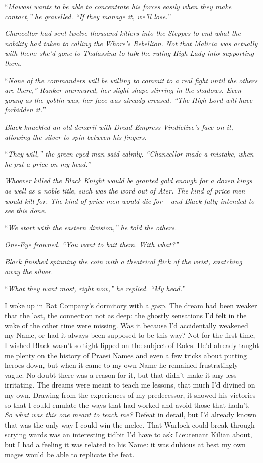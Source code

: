 \documentclass[12pt, openany]{book}
\begin{document}
“\textit{Mawasi wants to be able to concentrate his forces easily when they make contact,” he gravelled. “If they manage it, we’ll lose.”}

\textit{Chancellor had sent twelve thousand killers into the Steppes to end what the nobility had taken to calling the Whore’s Rebellion. Not that Malicia was actually with them: she’d gone to Thalassina to talk the ruling High Lady into supporting them. }

“\textit{None of the commanders will be willing to commit to a real fight until the others are there,” Ranker murmured, her slight shape stirring in the shadows. Even young as the goblin was, her face was already creased. “The High Lord will have forbidden it.”}

\textit{Black knuckled an old denarii with Dread Empress Vindictive’s face on it, allowing the silver to spin between his fingers.}

“\textit{They will,” the green-eyed man said calmly. “Chancellor made a mistake, when he put a price on my head.”}

\textit{Whoever killed the Black Knight would be granted gold enough for a dozen kings as well as a noble title, such was the word out of Ater. The kind of price men would kill for. The kind of price men would die for – and Black fully intended to see this done.}

“\textit{We start with the eastern division,” he told the others.}

\textit{One-Eye frowned. “You want to bait them. With what?”}

\textit{Black finished spinning the coin with a theatrical flick of the wrist, snatching away the silver.}

“\textit{What they want most, right now,” he replied. “My head.”}

I woke up in Rat Company’s dormitory with a gasp.
The dream had been weaker that the last, the connection not as deep: the ghostly sensations I’d felt in the wake of the other time were missing. Was it because I’d accidentally weakened my Name, or had it always been supposed to be this way? Not for the first time, I wished Black wasn’t so tight-lipped on the subject of Roles. He’d already taught me plenty on the history of Praesi Names and even a few tricks about putting heroes down, but when it came to my own Name he remained frustratingly vague. No doubt there was a reason for it, but that didn’t make it any less irritating. The dreams were meant to teach me lessons, that much I’d divined on my own. Drawing from the experiences of my predecessor, it showed his victories so that I could emulate the ways that had worked and avoid those that hadn’t. \textit{So what was this one meant to teach me?} Defeat in detail, but I’d already known that was the only way I could win the melee. That Warlock could break through scrying wards was an interesting tidbit I’d have to ask Lieutenant Kilian about, but I had a feeling it was related to his Name: it was dubious at best my own mages would be able to replicate the feat. 
\end{document}
